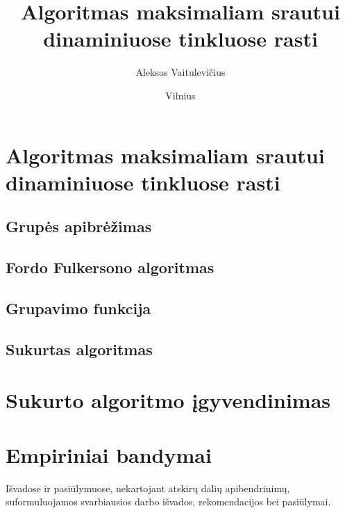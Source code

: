 \documentclass{VUMIFInfBakalaurinis}
\title{Algoritmas maksimaliam srautui dinaminiuose tinkluose rasti}
\author{Aleksas Vaitulevičius}
\date{Vilnius \\ \the\year}
\begin{document}
\maketitle







\tableofcontents





\section{Algoritmas maksimaliam srautui dinaminiuose tinkluose rasti}
\subsection{Grupės apibrėžimas}


\subsection{Fordo Fulkersono algoritmas}


\subsection{Grupavimo funkcija}


\subsection{Sukurtas algoritmas}


\section{Sukurto algoritmo įgyvendinimas}


\section{Empiriniai bandymai}


Išvadose ir pasiūlymuose, nekartojant atskirų dalių apibendrinimų,
suformuluojamos svarbiausios darbo išvados, rekomendacijos bei pasiūlymai.
\end{document}
